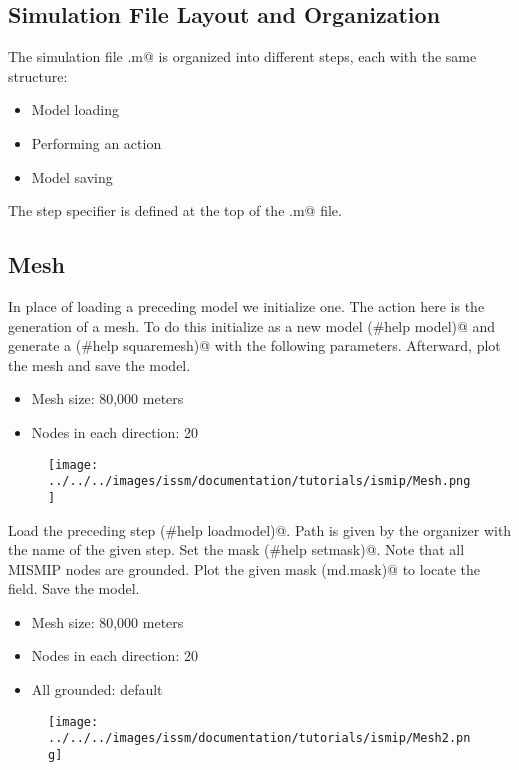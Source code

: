 \subsection{Simulation File Layout and Organization}  %
The simulation file \verb@runme.m@ is organized into different steps, each with the same structure:
\begin{itemize}
	\item Model loading
	\item Performing an action
	\item Model saving
\end{itemize}
The step specifier \verb@steps@ is defined at the top of the \verb@runme.m@ file.
\subsection{Mesh} %
In place of loading a preceding model we initialize one. The action here is the generation of a mesh. To do this initialize \verb@md@ as a new model \verb@(#help model)@ and generate a \verb@squaremesh@ \verb@(#help squaremesh)@ with the following parameters. Afterward, plot the mesh and save the model.
\begin{itemize}
	\item Mesh size: 80,000 meters
	\item Nodes in each direction: 20
\end{itemize}
\begin{figure}[H]
	\begin{center}
		\texttt{[image: ../../../images/issm/documentation/tutorials/ismip/Mesh.png]}
	\end{center}
\end{figure}
Load the preceding step \verb@(#help loadmodel)@. Path is given by the organizer with the name of the given step. Set the mask \verb@(#help setmask)@. Note that all MISMIP nodes are grounded. Plot the given mask \verb@(md.mask)@ to locate the field. Save the model.
\begin{itemize}
	\item Mesh size: 80,000 meters
	\item Nodes in each direction: 20
	\item All grounded: default
		\end{itemize}
		\begin{figure}[H]
			\begin{center}
				\texttt{[image: ../../../images/issm/documentation/tutorials/ismip/Mesh2.png]}
			\end{center}
		\end{figure}
